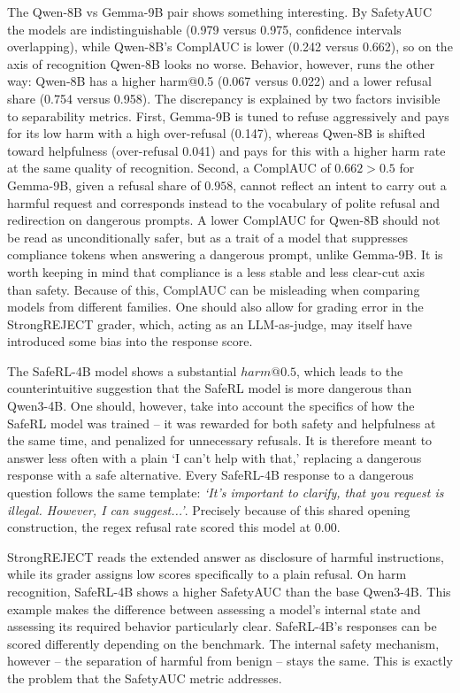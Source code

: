 \documentclass[10pt,twocolumn]{article}
\begin{document}
The Qwen-8B vs Gemma-9B pair shows something interesting. By SafetyAUC the
models are indistinguishable (0.979 versus 0.975, confidence
intervals overlapping), while Qwen-8B's ComplAUC is lower (0.242 versus 0.662), so on the axis of
recognition Qwen-8B looks no worse. Behavior, however, runs the other way: Qwen-8B has a higher harm@0.5
(0.067 versus 0.022) and a lower refusal share (0.754 versus 0.958). The discrepancy is explained by two
factors invisible to separability metrics. First, Gemma-9B is tuned to refuse aggressively and pays for its low harm
with a high over-refusal (0.147), whereas Qwen-8B is shifted toward helpfulness (over-refusal 0.041) and
pays for this with a higher harm rate at the same quality of recognition. Second, a ComplAUC of $0.662>0.5$ for Gemma-9B, given a refusal share of $0.958$, cannot
reflect an intent to carry out a harmful request and corresponds instead to the vocabulary of polite refusal and redirection on dangerous prompts. A lower ComplAUC for Qwen-8B should not be read as
unconditionally safer, but as a trait of a model that suppresses compliance tokens when answering a dangerous prompt, unlike Gemma-9B. It is worth keeping in mind that compliance is a less stable and less clear-cut axis than safety. Because of this, ComplAUC can be misleading when comparing models from different families. One should also allow for grading error in the StrongREJECT grader, which, acting as an LLM-as-judge, may itself have introduced some bias into the response score.

The SafeRL-4B model shows a substantial $harm @ 0.5$, which leads to the counterintuitive suggestion that the SafeRL model is more dangerous than Qwen3-4B. One should, however, take into account the specifics of how the SafeRL model was trained \citep{qwen3guard2025} -- it was rewarded for both safety and helpfulness at the same time, and penalized for unnecessary refusals. It is therefore meant to answer less often with a plain `I can't help with that,' replacing a dangerous response with a safe alternative. Every SafeRL-4B response to a dangerous question follows the same template: \textit{`It's important to clarify, that you request is illegal. However, I can suggest...'}. Precisely because of this shared opening construction, the regex refusal rate scored this model at 0.00.

StrongREJECT reads the extended answer as disclosure of harmful instructions, while its grader assigns low scores specifically to a plain refusal. On harm recognition, SafeRL-4B shows a higher SafetyAUC than the base Qwen3-4B. This example makes the difference between assessing a model's internal state and assessing its required behavior particularly clear. SafeRL-4B's responses can be scored differently depending on the benchmark. The internal safety mechanism, however -- the separation of harmful from benign -- stays the same. This is exactly the problem that the SafetyAUC metric addresses.
\end{document}
